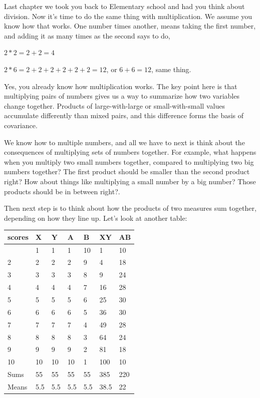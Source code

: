 \documentclass[
  letterpaper,
  DIV=11,
  numbers=noendperiod]{scrreprt}
\begin{document}
Last chapter we took you back to Elementary school and had you think
about division. Now it's time to do the same thing with multiplication.
We assume you know how that works. One number times another, means
taking the first number, and adding it as many times as the second says
to do,

\(2*2= 2+2=4\)

\(2*6= 2+2+2+2+2+2 = 12\), or \(6+6=12\), same thing.

Yes, you already know how multiplication works. The key point here is
that multiplying pairs of numbers gives us a way to summarize how two
variables change together. Products of large-with-large or
small-with-small values accumulate differently than mixed pairs, and
this difference forms the basis of covariance.

We know how to multiple numbers, and all we have to next is think about
the consequences of multiplying sets of numbers together. For example,
what happens when you multiply two small numbers together, compared to
multiplying two big numbers together? The first product should be
smaller than the second product right? How about things like multiplying
a small number by a big number? Those products should be in between
right?.

Then next step is to think about how the products of two measures sum
together, depending on how they line up. Let's look at another table:

\begin{longtable}[]{@{}lllllll@{}}
\toprule\noalign{}
scores & X & Y & A & B & XY & AB \\
\midrule\noalign{}
\endhead
\bottomrule\noalign{}
\endlastfoot
1 & 1 & 1 & 1 & 10 & 1 & 10 \\
2 & 2 & 2 & 2 & 9 & 4 & 18 \\
3 & 3 & 3 & 3 & 8 & 9 & 24 \\
4 & 4 & 4 & 4 & 7 & 16 & 28 \\
5 & 5 & 5 & 5 & 6 & 25 & 30 \\
6 & 6 & 6 & 6 & 5 & 36 & 30 \\
7 & 7 & 7 & 7 & 4 & 49 & 28 \\
8 & 8 & 8 & 8 & 3 & 64 & 24 \\
9 & 9 & 9 & 9 & 2 & 81 & 18 \\
10 & 10 & 10 & 10 & 1 & 100 & 10 \\
Sums & 55 & 55 & 55 & 55 & 385 & 220 \\
Means & 5.5 & 5.5 & 5.5 & 5.5 & 38.5 & 22 \\
\end{longtable}
\end{document}
